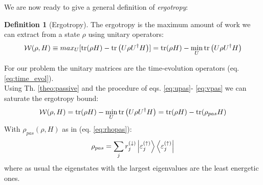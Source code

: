 \documentclass[12pt,a4paper]{book}
\theoremstyle{definition}
\newtheorem{definition}{Definition}[section]
\begin{document}
We are now ready to give a general definition of \textit{ergotropy}:
\begin{definition}[Ergotropy]\label{eq:def_ergotropy}
	The ergotropy is the maximum amount of work we can extract from a state $\rho$ using unitary operators:
\begin{equation}
	\mathcal{W}(\rho, H)\equiv max _{U}[\tr(\rho H)- \tr\left(U \rho U^{\dagger} H\right)]=\tr(\rho H)-\min _{U}\tr\left(U \rho U^{\dagger} H\right)
\end{equation}
\end{definition}
For our problem the unitary matrices are the time-evolution operators (eq. \ref{eq:time_evol}).\\
Using Th. \ref{theo:passive} and the procedure of eqs. \ref{eq:upas}- \ref{eq:vpas} we can saturate the ergotropy bound:
\begin{equation}\label{eq:ergowithpas}
	\mathcal{W}(\rho, H)=\tr(\rho H)-\min _{U}\tr\left(U \rho U^{\dagger} H\right)=\tr(\rho H)-\tr(\rho_{pas}H)
\end{equation}
With $\rho_{pas}(\rho,H) $ as in (eq. \ref{eq:rhopas}):
\begin{equation}
	\rho_{pas}=\sum_{j} r_{j}^{(\downarrow)}\ket{\varepsilon_{j}^{(\uparrow)}}\bra{\varepsilon_{j}^{(\uparrow)}}
\end{equation}
where as usual the eigenstates with the largest eigenvalues are the least energetic ones.


\end{document}
